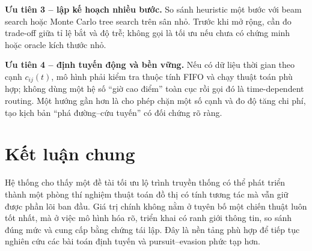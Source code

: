 \textbf{Ưu tiên 3 -- lập kế hoạch nhiều bước.} So sánh heuristic một bước với
beam search hoặc Monte Carlo tree search \cite{browne2012} trên sân nhỏ. Trước khi mở rộng, cần đo
trade-off giữa tỉ lệ bắt và độ trễ; không gọi là tối ưu nếu chưa có chứng minh
hoặc oracle kích thước nhỏ.

\textbf{Ưu tiên 4 -- định tuyến động và bền vững.} Nếu có dữ liệu thời gian theo
cạnh $c_{ij}(t)$, mô hình phải kiểm tra thuộc tính FIFO và chạy thuật toán phù
hợp; không dùng một hệ số ``giờ cao điểm'' toàn cục rồi gọi đó là time-dependent
routing. Một hướng gần hơn là cho phép chặn một số cạnh và đo độ tăng chi phí,
tạo kịch bản ``phá đường--cứu tuyến'' có đối chứng rõ ràng.

\section{Kết luận chung}

Hệ thống cho thấy một đề tài tối ưu lộ trình truyền thống có thể phát triển thành
một phòng thí nghiệm thuật toán đồ thị có tính tương tác mà vẫn giữ được phần lõi
ban đầu. Giá trị chính không nằm ở tuyên bố một chiến thuật luôn tốt nhất, mà ở
việc mô hình hóa rõ, triển khai có ranh giới thông tin, so sánh đúng mức và cung
cấp bằng chứng tái lập. Đây là nền tảng phù hợp để tiếp tục nghiên cứu các bài
toán định tuyến và pursuit--evasion phức tạp hơn.
